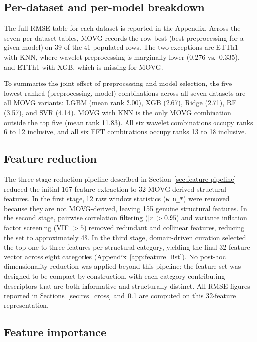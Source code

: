 \documentclass[a4paper,12pt]{article}
\begin{document}
\subsection{Per-dataset and per-model breakdown}
\label{sec:res_per_ds}

The full RMSE table for each dataset is reported in the Appendix. Across the seven per-dataset tables, MOVG records the row-best (best preprocessing for a given model) on 39 of the 41 populated rows. The two exceptions are ETTh1 with KNN, where wavelet preprocessing is marginally lower (0.276 vs.\ 0.335), and ETTh1 with XGB, which is missing for MOVG.

To summarise the joint effect of preprocessing and model selection, the five lowest-ranked (preprocessing, model) combinations across all seven datasets are all MOVG variants: LGBM (mean rank 2.00), XGB (2.67), Ridge (2.71), RF (3.57), and SVR (4.14). MOVG with KNN is the only MOVG combination outside the top five (mean rank 11.83). All six wavelet combinations occupy ranks 6 to 12 inclusive, and all six FFT combinations occupy ranks 13 to 18 inclusive.

\subsection{Feature reduction}
\label{sec:res_features}

The three-stage reduction pipeline described in Section~\ref{sec:feature-pipeline} reduced the initial 167-feature extraction to 32 MOVG-derived structural features. In the first stage, 12 raw window statistics (\texttt{win\_*}) were removed because they are not MOVG-derived, leaving 155 genuine structural features. In the second stage, pairwise correlation filtering ($|r| > 0.95$) and variance inflation factor screening (VIF $> 5$) removed redundant and collinear features, reducing the set to approximately 48. In the third stage, domain-driven curation selected the top one to three features per structural category, yielding the final 32-feature vector across eight categories (Appendix~\ref{app:feature_list}). No post-hoc dimensionality reduction was applied beyond this pipeline: the feature set was designed to be compact by construction, with each category contributing descriptors that are both informative and structurally distinct. All RMSE figures reported in Sections~\ref{sec:res_cross} and~\ref{sec:res_per_ds} are computed on this 32-feature representation.

\subsection{Feature importance}
\label{sec:res_shap}
\end{document}
